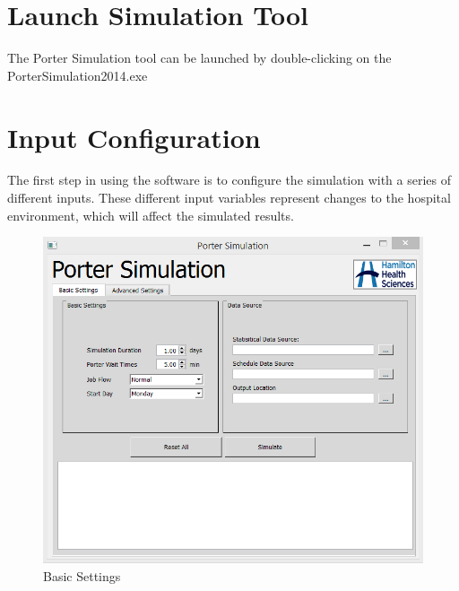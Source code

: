 \documentclass[paper=letter, fontsize=10pt]{scrartcl}
\numberwithin{equation}{section}		%
\numberwithin{figure}{section}			%
\numberwithin{table}{section}				%
\begin{document}
\section{Launch Simulation Tool}
The Porter Simulation tool can be launched by double-clicking on the PorterSimulation2014.exe

\section{Input Configuration}
The first step in using the software is to configure the simulation with a series of different inputs. These different input variables represent changes to the hospital environment, which will affect the simulated results.

	\begin{figure}[!htbp]
	\begin{center}
		\includegraphics[width=1\columnwidth, height=0.45\textheight, keepaspectratio]{BasicSettings.png}
		\caption{Basic Settings}
	\end{center}
	\end{figure} 
\end{document}
